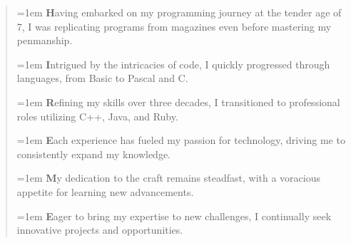 \begin{quote}
    \hangindent=1em
    {\Large\textbf{H}}aving embarked on my programming journey at the tender age of 7, I was replicating programs from magazines even before mastering my penmanship.

    \hangindent=1em
    {\Large\textbf{I}}ntrigued by the intricacies of code, I quickly progressed through languages, from Basic to Pascal and C.

    \hangindent=1em
    {\Large\textbf{R}}efining my skills over three decades, I transitioned to professional roles utilizing C++, Java, and Ruby.

    \hangindent=1em
    {\Large\textbf{E}}ach experience has fueled my passion for technology, driving me to consistently expand my knowledge.

    \hangindent=1em
    {\Large\textbf{M}}y dedication to the craft remains steadfast, with a voracious appetite for learning new advancements.

    \hangindent=1em
    {\Large\textbf{E}}ager to bring my expertise to new challenges, I continually seek innovative projects and opportunities.
\end{quote}
